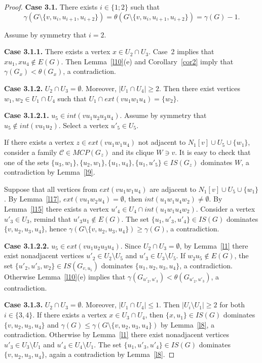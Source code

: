 \documentclass[12pt]{article}
\begin{document}
\begin{proof}
\textbf{Case 3.1.} There exists $i \in \{1;2\}$ such that $$\gamma(G \setminus \{v,u_i,u_{i+1},u_{i+2}\}) = \theta(G \setminus \{v,u_i,u_{i+1},u_{i+2}\}) = \gamma(G) - 1.$$ 

Assume by symmetry that $i = 2$.

\textbf{Case 3.1.1.} There exists a vertex $x \in U_2 \cap U_3$. Case~2 implies that $xu_1,xu_4 \notin E(G)$. Then Lemma~\ref{l10}(e) and Corollary~\ref{cor2} imply that $\gamma(G_x) < \theta(G_x)$, a contradiction.

\textbf{Case 3.1.2.} $U_2 \cap U_3 = \emptyset$. Moreover, $|U_1 \cap U_4| \geq 2$. Then there exist vertices $w_1,w_2 \in U_1 \cap U_4$ such that $U_1 \cap ext(vu_1w_1u_4) = \{w_2\}$. 

\textbf{Case 3.1.2.1.} $u_5 \in int(vu_1u_2u_3u_4)$. Assume by symmetry that $u_5 \notin int(vu_1u_2)$. Select a vertex $u'_5 \in U_5$. 

If there exists a vertex $z \in ext(vu_1w_1u_4)$ not adjacent to $N_1[v] \cup U_5 \cup \{w_1\}$, consider a family $\mathcal{C} \in MCP(G_z)$ and its clique $W \ni v$. It is easy to check that one of the sets $\{u_3,w_1\}, \{u_2,w_1\}, \{u_1,u_4\}, \{u_1,u'_5\} \in IS(G_z)$ dominates $W$, a contradiction by Lemma~\ref{l9}. 

Suppose that all vertices from $ ext(vu_1w_1u_4)$ are adjacent to $N_1[v] \cup U_5 \cup \{w_1\}$. By Lemma~\ref{l17}, $ext(vu_1w_2u_4) = \emptyset$, then $int(u_1w_1u_4w_2) \neq \emptyset$. By Lemma~\ref{l15} there exists a vertex $u'_4 \in U_4 \cap int(u_1w_1u_4w_2)$. Consider a vertex $u'_3 \in U_3$, remind that $u'_3u_1 \notin E(G)$. The set $\{u_1,u'_3,u'_4\} \in IS(G)$ dominates $\{v,u_2,u_3,u_4\}$, hence $\gamma(G \setminus \{v,u_2,u_3,u_4\}) \geq \gamma(G)$, a contradiction.

\textbf{Case 3.1.2.2.} $u_5 \in ext(vu_1u_2u_3u_4)$. Since $U_2 \cap U_3 = \emptyset$, by Lemma~\ref{l1} there exist nonadjacent vertices $u'_2 \in U_2 \setminus U_5$ and $u'_3 \in U_3 \setminus U_5$. If $w_2u_5 \notin E(G)$, the set $\{u'_2,u'_3,w_2\} \in IS(G_{v,u_5})$ dominates $\{u_1,u_2,u_3,u_4\}$, a contradiction. Otherwise Lemma~\ref{l10}(e) implies that $\gamma(G_{u'_2,u'_3}) < \theta(G_{u'_2,u'_3})$, a contradiction.

\textbf{Case 3.1.3.} $U_2 \cap U_3 = \emptyset$. Moreover, $|U_1 \cap U_4| \leq 1$. Then $|U_i \setminus U_1| \geq 2$ for both $i \in \{3,4\}$. If there exists a vertex $x \in U_3 \cap U_4$, then $\{x,u_1\} \in IS(G)$ dominates $\{v,u_2,u_3,u_4\}$ and $\gamma(G) \leq \gamma(G \setminus \{v,u_2,u_3,u_4\})$ by Lemma~\ref{l8}, a contradiction. Otherwise by Lemma~\ref{l1} there exist nonadjacent vertices $u'_3 \in U_3 \setminus U_1$ and $u'_4 \in U_4 \setminus U_1$. The set $\{u_1,u'_3,u'_4\} \in IS(G)$ dominates $\{v,u_2,u_3,u_4\}$, again a contradiction by Lemma~\ref{l8}.


\end{proof}
\end{document}
